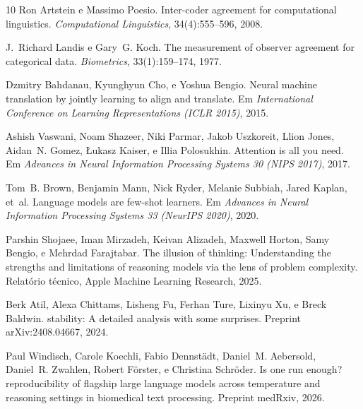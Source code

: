 \documentclass[12pt,a4paper]{article}
\begin{document}
\begin{thebibliography}{10}
Ron Artstein e Massimo Poesio.
\newblock Inter-coder agreement for computational linguistics.
\newblock \emph{Computational Linguistics}, 34(4):555--596, 2008.

J.~Richard Landis e Gary~G. Koch.
\newblock The measurement of observer agreement for categorical data.
\newblock \emph{Biometrics}, 33(1):159--174, 1977.

Dzmitry Bahdanau, Kyunghyun Cho, e Yoshua Bengio.
\newblock Neural machine translation by jointly learning to align and
  translate.
\newblock Em \emph{International Conference on Learning Representations (ICLR
  2015)}, 2015.

Ashish Vaswani, Noam Shazeer, Niki Parmar, Jakob Uszkoreit, Llion Jones,
  Aidan~N. Gomez, {\L}ukasz Kaiser, e Illia Polosukhin.
\newblock Attention is all you need.
\newblock Em \emph{Advances in Neural Information Processing Systems 30 (NIPS
  2017)}, 2017.

Tom~B. Brown, Benjamin Mann, Nick Ryder, Melanie Subbiah, Jared Kaplan, et~al.
\newblock Language models are few-shot learners.
\newblock Em \emph{Advances in Neural Information Processing Systems 33
  (NeurIPS 2020)}, 2020.

Parshin Shojaee, Iman Mirzadeh, Keivan Alizadeh, Maxwell Horton, Samy Bengio,
  e Mehrdad Farajtabar.
\newblock The illusion of thinking: Understanding the strengths and
  limitations of reasoning models via the lens of problem complexity.
\newblock Relatório técnico, Apple Machine Learning Research, 2025.

Berk Atil, Alexa Chittams, Lisheng Fu, Ferhan Ture, Lixinyu Xu, e Breck Baldwin.
 stability: A detailed analysis with some surprises.
\newblock Preprint arXiv:2408.04667, 2024.

Paul Windisch, Carole Koechli, Fabio Dennstädt, Daniel~M. Aebersold,
  Daniel~R. Zwahlen, Robert Förster, e Christina Schröder.
\newblock Is one run enough? reproducibility of flagship large language models
  across temperature and reasoning settings in biomedical text processing.
\newblock Preprint medRxiv, 2026.

\end{thebibliography}
\end{document}
